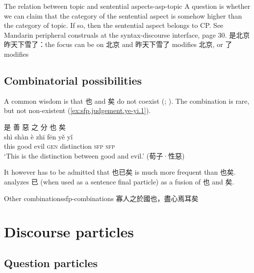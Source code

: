 \documentclass[UTF8, a4paper, oneside, scheme=plain, 12pt]{ctexrep}
\newcommand*{\citepage}[1]{p.~{#1}}
\newcommand{\translate}[1]{`#1'}
\newcommand*{\category}[1]{\textsc{#1}}
\begin{document}
\begin{todobox}{The relation between topic and sentential aspect}{s-asp-topic}
    A question is whether we can claim that the category of the sentential aspect
    is somehow higher than the category of topic.
    If so, then the sentential aspect belongs to CP.
    See Mandarin peripheral construals at the syntax-discourse interface, page 30.
    是北京昨天下雪了：the focus can be on 北京 and 昨天下雪了 modifies 北京,
    or 了 modifies 
\end{todobox}



\subsection{Combinatorial possibilities}

A common wisdom is that 也 and 矣 do not coexist 
(\citealt[\citepage{445}]{meiguang2018}; \citealt[\citepage{19}]{pulleyblank1995outline}).
The combination is rare, but not non-existent (\ref{ex:sfp.judgement.ye-yi.1}).

\begin{exe}
    \ex\label{ex:sfp.judgement.ye-yi.1}
    \glll 是 善 惡 之 分 也 矣 \\
    shì shàn è zhī fēn yě yǐ \\
    this good evil \category{gen} distinction \category{sfp} \category{sfp} \\
    \glt\translate{This is the distinction between good and evil.} \hfill (荀子·性惡)
\end{exe}

It however has to be admitted that 也已矣 is much more frequent than 也矣.
\citet[\citepage{20}]{pulleyblank1995outline} analyzes 已 (when used as a sentence final particle) as a fusion of 也 and 矣.

\begin{todobox}{Other combinations}{sfp-combinations}
    寡人之於國也，盡心焉耳矣
\end{todobox}

\section{Discourse particles}\label{sec:sfp.discourse}

\subsection{Question particles}
\end{document}
